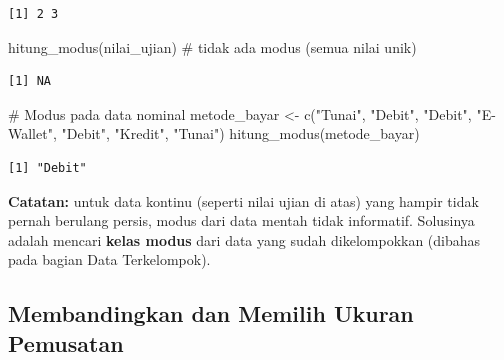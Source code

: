 \documentclass[
  indonesian,
  letterpaper,
]{book}
\newenvironment{Shaded}{\begin{snugshade}}{\end{snugshade}}
\newcommand{\CommentTok}[1]{\textcolor[rgb]{0.37,0.37,0.37}{#1}}
\newcommand{\FunctionTok}[1]{\textcolor[rgb]{0.28,0.35,0.67}{#1}}
\newcommand{\NormalTok}[1]{\textcolor[rgb]{0.00,0.23,0.31}{#1}}
\newcommand{\OtherTok}[1]{\textcolor[rgb]{0.00,0.23,0.31}{#1}}
\newcommand{\StringTok}[1]{\textcolor[rgb]{0.13,0.47,0.30}{#1}}
\begin{document}
\begin{verbatim}
[1] 2 3
\end{verbatim}

\begin{Shaded}
\begin{Highlighting}[]
\FunctionTok{hitung\_modus}\NormalTok{(nilai\_ujian)              }\CommentTok{\# tidak ada modus (semua nilai unik)}
\end{Highlighting}
\end{Shaded}

\begin{verbatim}
[1] NA
\end{verbatim}

\begin{Shaded}
\begin{Highlighting}[]
\CommentTok{\# Modus pada data nominal}
\NormalTok{metode\_bayar }\OtherTok{\textless{}{-}} \FunctionTok{c}\NormalTok{(}\StringTok{"Tunai"}\NormalTok{, }\StringTok{"Debit"}\NormalTok{, }\StringTok{"Debit"}\NormalTok{, }\StringTok{"E{-}Wallet"}\NormalTok{, }\StringTok{"Debit"}\NormalTok{, }\StringTok{"Kredit"}\NormalTok{, }\StringTok{"Tunai"}\NormalTok{)}
\FunctionTok{hitung\_modus}\NormalTok{(metode\_bayar)}
\end{Highlighting}
\end{Shaded}

\begin{verbatim}
[1] "Debit"
\end{verbatim}

\textbf{Catatan:} untuk data kontinu (seperti nilai ujian di atas) yang
hampir tidak pernah berulang persis, modus dari data mentah tidak
informatif. Solusinya adalah mencari \textbf{kelas modus} dari data yang
sudah dikelompokkan (dibahas pada bagian Data Terkelompok).

\subsection{Membandingkan dan Memilih Ukuran
Pemusatan}\label{membandingkan-dan-memilih-ukuran-pemusatan}
\end{document}
